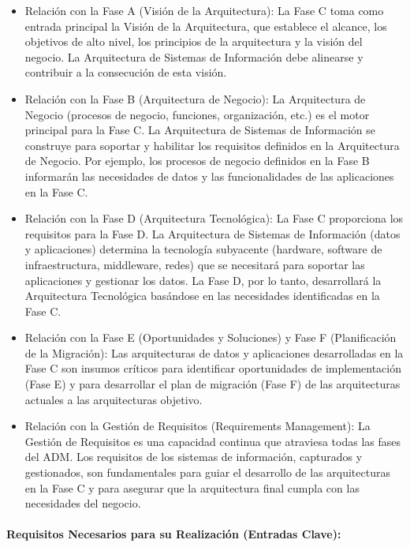 \documentclass[
	a4paper, %
	12pt, %
]{include/CSSullivanBusinessReport}
\def\tightlist{}
\begin{document}
\begin{itemize}
\tightlist
\item
  Relación con la Fase A (Visión de la Arquitectura): La Fase C toma
  como entrada principal la Visión de la Arquitectura, que establece el
  alcance, los objetivos de alto nivel, los principios de la
  arquitectura y la visión del negocio. La Arquitectura de Sistemas de
  Información debe alinearse y contribuir a la consecución de esta
  visión.
\item
  Relación con la Fase B (Arquitectura de Negocio): La Arquitectura de
  Negocio (procesos de negocio, funciones, organización, etc.) es el
  motor principal para la Fase C. La Arquitectura de Sistemas de
  Información se construye para soportar y habilitar los requisitos
  definidos en la Arquitectura de Negocio. Por ejemplo, los procesos de
  negocio definidos en la Fase B informarán las necesidades de datos y
  las funcionalidades de las aplicaciones en la Fase C.
\item
  Relación con la Fase D (Arquitectura Tecnológica): La Fase C
  proporciona los requisitos para la Fase D. La Arquitectura de Sistemas
  de Información (datos y aplicaciones) determina la tecnología
  subyacente (hardware, software de infraestructura, middleware, redes)
  que se necesitará para soportar las aplicaciones y gestionar los
  datos. La Fase D, por lo tanto, desarrollará la Arquitectura
  Tecnológica basándose en las necesidades identificadas en la Fase C.
\item
  Relación con la Fase E (Oportunidades y Soluciones) y Fase F
  (Planificación de la Migración): Las arquitecturas de datos y
  aplicaciones desarrolladas en la Fase C son insumos críticos para
  identificar oportunidades de implementación (Fase E) y para
  desarrollar el plan de migración (Fase F) de las arquitecturas
  actuales a las arquitecturas objetivo.
\item
  Relación con la Gestión de Requisitos (Requirements Management): La
  Gestión de Requisitos es una capacidad continua que atraviesa todas
  las fases del ADM. Los requisitos de los sistemas de información,
  capturados y gestionados, son fundamentales para guiar el desarrollo
  de las arquitecturas en la Fase C y para asegurar que la arquitectura
  final cumpla con las necesidades del negocio.
\end{itemize}

\paragraph{Requisitos Necesarios para su Realización (Entradas
Clave):}\label{sec:requisitos-necesarios-para-su-realizaciuxf3n-entradas-clave}
\end{document}
